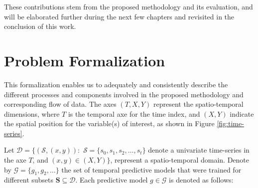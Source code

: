  
These contributions stem from the proposed methodology and its evaluation, and will be elaborated further during the next few chapters and revisited in the conclusion of this work.

\section{Problem Formalization}
\label{Sec:ProblemFormalization}

This formalization enables us to adequately and consistently describe the different processes and components involved in the proposed methodology and corresponding flow of data. The axes $\left(T, X, Y\right)$ represent the spatio-temporal dimensions, where $T$ is the temporal axe for the time index, and $(X,Y)$ indicate the spatial position for the variable(s) of interest, as shown in Figure \ref{fig:time-series}.

Let $\mathcal{D} = \{(\mathcal{S},( x, y)): \,\, \mathcal{S} = \{s_{0}, s_{1}, s_{2}, \ldots, s_{t}\}$ denote a univariate time-series in the axe $T$, and $(x,y) \in (X,Y)\}$, represent a spatio-temporal domain. Denote by $\mathcal{G} = \{g_{1}, g_{2}, \ldots \}$ the set of temporal predictive models that were trained for different subsets $\mathbf{S} \subseteq \mathcal{D}$. Each predictive model $g\in \mathcal{G}$ is denoted as follows:

